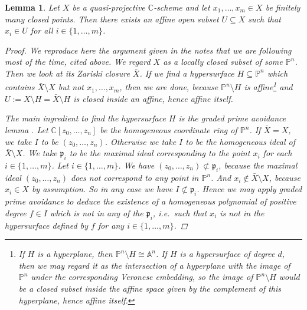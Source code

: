 \documentclass[12pt,a4paper]{amsart}
\theoremstyle{plain}
\newtheorem{lm}[thm]{Lemma}
\theoremstyle{definition}
\theoremstyle{remark}
\begin{document}
\begin{lm}\label{lm:avoidpoints}
  Let $X$ be a quasi-projective $\mathbb{C}$-scheme and let $x_{1},\ldots, x_{m} \in X$ be finitely many closed points.
  Then there exists an affine open subset $U \subseteq X$ such that $x_{i} \in U$ for all $i \in \{ 1, \ldots, m\}$.
  \begin{proof}
    We reproduce here the argument given in the notes that we are following most of the time, cited above.
    We regard $X$ as a locally closed subset of some $\mathbb{P}^{n}$.
    Then we look at its Zariski closure $\bar{X}$.
    If we find a hypersurface $H \subseteq \mathbb{P}^{n}$ which contains $\bar{X} \setminus X$ but not $x_{1}, \ldots, x_{m}$, then we are done, because $\mathbb{P}^{n} \setminus H$ is affine\footnote{If $H$ is a hyperplane, then $\mathbb{P}^{n} \setminus H \cong \mathbb{A}^{n}$.
    If $H$ is a hypersurface of degree $d$, then we may regard it as the intersection of a hyperplane with the image of $\mathbb{P}^{n}$ under the corresponding Veronese embedding, so the image of $\mathbb{P}^{n} \setminus H$ would be a closed subset inside the affine space given by the complement of this hyperplane, hence affine itself.} and $U := X \setminus H = \bar{X} \setminus H$ is closed inside an affine, hence affine itself.
    
    The main ingredient to find the hypersurface $H$ is the graded prime avoidance lemma \cite[\href{https://stacks.math.columbia.edu/tag/00JS}{Tag 00JS}]{stacks-project}.
    Let $\mathbb{C}[z_{0},\ldots,z_{n}]$ be the homogeneous coordinate ring of $\mathbb{P}^{n}$.
    If $\bar{X} = X$, we take $I$ to be $(z_{0}, \ldots, z_{n})$.
    Otherwise we take $I$ to be the homogeneous ideal of $\bar{X} \setminus X$.
    We take $\mathfrak{p}_{i}$ to be the maximal ideal corresponding to the point $x_{i}$ for each $i \in \{1, \ldots, m\}$.
    Let $i \in \{ 1, \ldots, m\}$.
    We have $(z_{0}, \ldots, z_{n}) \not\subset \mathfrak{p}_{i}$, because the maximal ideal $(z_{0}, \ldots, z_{n})$ does not correspond to any point in $\mathbb{P}^{n}$.
    And $x_{i} \not \in \bar{X} \setminus X$, because $x_{i} \in X$ by assumption.
    So in any case we have $I \not \subset \mathfrak{p}_{i}$.
    Hence we may apply graded prime avoidance to deduce the existence of a homogeneous polynomial of positive degree $f \in I$ which is not in any of the $\mathfrak{p}_{i}$, i.e.~such that $x_{i}$ is not in the hypersurface defined by $f$ for any $i \in \{1, \ldots, m\}$.
  \end{proof}
\end{lm}
\end{document}
